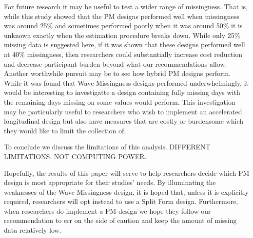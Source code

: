 \documentclass{svjour3}\usepackage[]{graphicx}\usepackage[]{color}
\begin{document}
For future research it may be useful to test a wider range of missingness. That is, while this study showed that the PM designs performed well when missingness was around 25\% and sometimes performed poorly when it was around 50\% it is unknown exactly when the estimation procedure breaks down. While only 25\% missing data is suggested here, if it was shown that these designs performed well at 40\% missingness, then researchers could substantially increase cost reduction and decrease participant burden beyond what our recommendations allow. Another worthwhile pursuit may be to see how hybrid PM designs perform. While it was found that Wave Missingness designs performed underwhelmingly, it would be interesting to investigatte a design containing fully missing days with the remaining days missing on some values would perform. This investigation may be particularly useful to researchers who wish to implement an accelerated longitudinal design but also have measures that are costly or burdensome which they would like to limit the collection of. \par

To conclude we discuss the limitations of this analysis. DIFFERENT LIMITATIONS. NOT COMPUTING POWER.

Hopefully, the results of this paper will serve to help researchers decide which PM design is most appropriate for their studies' needs. By illuminating the weaknesses of the Wave Missingness design, it is hoped that, unless it is explicitly required, researchers will opt instead to use a Split Form design. Furthermore, when researchers do implement a PM design we hope they follow our recommendation to err on the side of caution and keep the amount of missing data relatively low. \par



\end{document}
